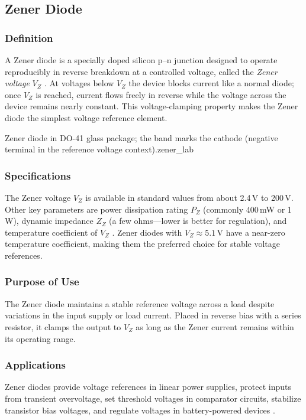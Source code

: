 \subsection{Zener Diode}

\subsubsection*{Definition}
A Zener diode is a specially doped silicon p--n junction designed to operate
reproducibly in reverse breakdown at a controlled voltage, called the \textit{Zener
voltage} $V_Z$ \cite{boylestad2015}. At voltages below $V_Z$ the device blocks current
like a normal diode; once $V_Z$ is reached, current flows freely in reverse while the
voltage across the device remains nearly constant. This voltage-clamping property makes
the Zener diode the simplest voltage reference element.

%
  {Zener diode in DO-41 glass package; the band marks the cathode
   (negative terminal in the reference voltage context).}{zener_lab}

\subsubsection*{Specifications}
The Zener voltage $V_Z$ is available in standard values from about 2.4\,V to 200\,V.
Other key parameters are power dissipation rating $P_Z$ (commonly 400\,mW or 1\,W),
dynamic impedance $Z_Z$ (a few ohms---lower is better for regulation), and temperature
coefficient of $V_Z$ \cite{sedra2020}. Zener diodes with $V_Z \approx 5.1$\,V have a
near-zero temperature coefficient, making them the preferred choice for stable voltage
references.

\subsubsection*{Purpose of Use}
The Zener diode maintains a stable reference voltage across a load despite variations in
the input supply or load current. Placed in reverse bias with a series resistor, it
clamps the output to $V_Z$ as long as the Zener current remains within its operating
range.

\subsubsection*{Applications}
Zener diodes provide voltage references in linear power supplies, protect inputs from
transient overvoltage, set threshold voltages in comparator circuits, stabilize transistor
bias voltages, and regulate voltages in battery-powered devices \cite{boylestad2015}.
